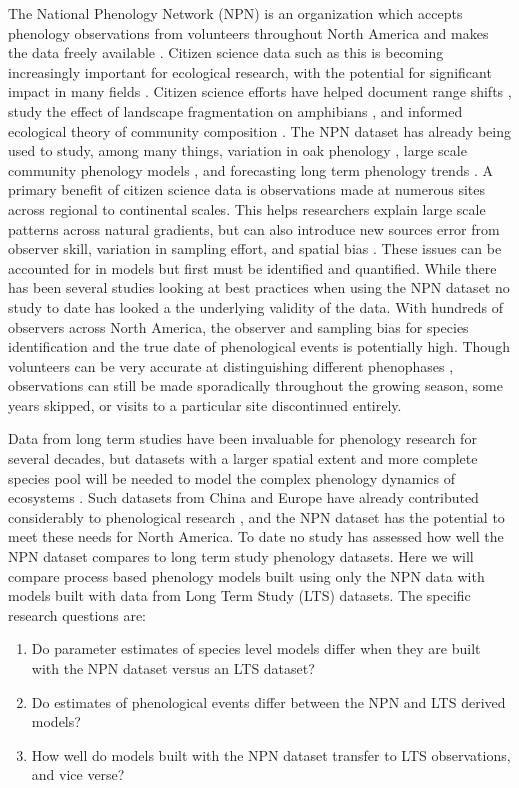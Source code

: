\documentclass[fleqn,10pt,lineno]{wlpeerj} %
\begin{document}
The National Phenology Network (NPN) is an organization which accepts phenology observations from volunteers throughout North America and makes the data freely available \citep{schwartz2012a}. Citizen science data such as this is becoming increasingly important for ecological research, with the potential for significant impact in many fields \citep{dickinson2010, tulloch2013, kelling2009}. Citizen science efforts have helped document range shifts \citep{hitch2007}, study the effect of landscape fragmentation on amphibians \citep{cosentino2014}, and informed ecological theory of community composition \citep{locey2013}. The NPN dataset has already being used to study, among many things, variation in oak phenology \citep{gerst2017}, large scale community phenology models \citep{melaas2016}, and forecasting long term phenology trends \citep{jeong2013}. A primary benefit of citizen science data is observations made at numerous sites across regional to continental scales. This helps researchers explain large scale patterns across natural gradients, but can also introduce new sources error from observer skill, variation in sampling effort, and spatial bias \citep{dickinson2010}. These issues can be accounted for in models but first must be identified and quantified. While there has been several studies looking at best practices when using the NPN dataset \citep{crimmins2017, gerst2016} no study to date has looked a the underlying validity of the data. With hundreds of observers across North America, the observer and sampling bias for species identification and the true date of phenological events is potentially high. Though volunteers can be very accurate at distinguishing different phenophases \citep{fuccillo2015}, observations can still be made sporadically throughout the growing season, some years skipped, or visits to a particular site discontinued entirely. 

Data from long term studies have been invaluable for phenology research for several decades, but datasets with a larger spatial extent and more complete species pool will be needed to model the complex phenology dynamics of ecosystems \citep{richardson2012, diez2012, caradonna2014}. Such datasets from China and Europe have already contributed considerably to phenological research \citep{olsson2014, basler2016, xu2013, zhang2017}, and the NPN dataset has the potential to meet these needs for North America. To date no study has assessed how well the NPN dataset compares to long term study phenology datasets. Here we will compare process based phenology models built using only the NPN data with models built with data from Long Term Study (LTS) datasets. The specific research questions are:
\begin{enumerate}
\item Do parameter estimates of species level models differ when they are built with the NPN dataset versus an LTS dataset?
\item Do estimates of phenological events differ between the NPN and LTS derived models?
\item How well do models built with the NPN dataset transfer to LTS observations, and vice verse?
\end{enumerate}
\end{document}
